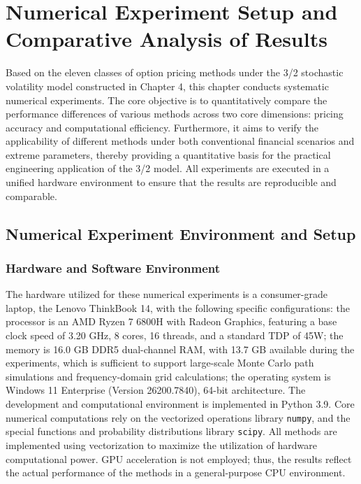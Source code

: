 \chapter{Numerical Experiment Setup and Comparative Analysis of Results}\label{chap:empirical} %

Based on the eleven classes of option pricing methods under the 3/2 stochastic volatility model constructed in Chapter 4, this chapter conducts systematic numerical experiments. The core objective is to quantitatively compare the performance differences of various methods across two core dimensions: pricing accuracy and computational efficiency. Furthermore, it aims to verify the applicability of different methods under both conventional financial scenarios and extreme parameters, thereby providing a quantitative basis for the practical engineering application of the 3/2 model. All experiments are executed in a unified hardware environment to ensure that the results are reproducible and comparable.

\section{Numerical Experiment Environment and Setup}

\subsection{Hardware and Software Environment}
The hardware utilized for these numerical experiments is a consumer-grade laptop, the Lenovo ThinkBook 14, with the following specific configurations: the processor is an AMD Ryzen 7 6800H with Radeon Graphics, featuring a base clock speed of 3.20 GHz, 8 cores, 16 threads, and a standard TDP of 45W; the memory is 16.0 GB DDR5 dual-channel RAM, with 13.7 GB available during the experiments, which is sufficient to support large-scale Monte Carlo path simulations and frequency-domain grid calculations; the operating system is Windows 11 Enterprise (Version 26200.7840), 64-bit architecture. The development and computational environment is implemented in Python 3.9. Core numerical computations rely on the vectorized operations library \texttt{numpy}, and the special functions and probability distributions library \texttt{scipy}. All methods are implemented using vectorization to maximize the utilization of hardware computational power. GPU acceleration is not employed; thus, the results reflect the actual performance of the methods in a general-purpose CPU environment.

